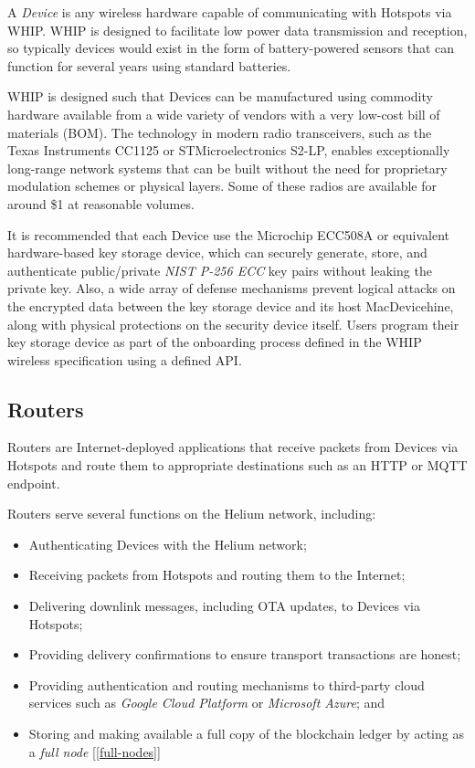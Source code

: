 \documentclass[10pt, nonatbib, nocopyrightspace, reprint]{sigplanconf}
\newcommand{\secref}[1]{[\autoref{#1}]}
\begin{document}
A \emph{Device} is any wireless hardware capable of communicating with Hotspots via WHIP. WHIP is designed to facilitate low power data transmission and reception, so typically devices would exist in the form of battery-powered sensors that can function for several years using standard batteries.

WHIP is designed such that Devices can be manufactured using commodity hardware available from a wide variety of vendors with a very low-cost bill of materials (BOM). The technology in modern radio transceivers, such as the Texas Instruments CC1125 or STMicroelectronics S2-LP, enables exceptionally long-range network systems that can be built without the need for proprietary modulation schemes or physical layers. Some of these radios are available for around \$1 at reasonable volumes.

It is recommended that each Device use the Microchip ECC508A or equivalent hardware-based key storage device, which can securely generate, store, and authenticate public/private \emph{NIST P-256 ECC} \cite{nist} key pairs without leaking the private key. Also, a wide array of defense mechanisms prevent logical attacks on the encrypted data between the key storage device and its host MacDevicehine, along with physical protections on the security device itself. Users program their key storage device as part of the onboarding process defined in the WHIP wireless specification using a defined API\@.

\subsection{Routers}

Routers are Internet-deployed applications that receive packets from Devices via Hotspots and route them to appropriate destinations such as an HTTP or MQTT endpoint.

Routers serve several functions on the Helium network, including:

\begin{itemize}
    \item Authenticating Devices with the Helium network;
    \item Receiving packets from Hotspots and routing them to the Internet;
    \item Delivering downlink messages, including OTA updates, to Devices via Hotspots;
    \item Providing delivery confirmations to ensure transport transactions are honest;
    \item Providing authentication and routing mechanisms to third-party cloud services such as \emph{Google Cloud Platform} or \emph{Microsoft Azure}; and
    \item Storing and making available a full copy of the blockchain ledger by acting as a \emph{full node} \secref{full-nodes}
\end{itemize}
\end{document}

